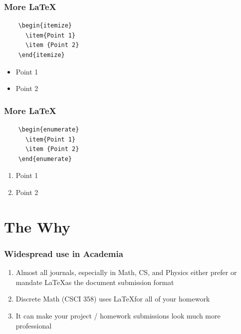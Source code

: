 \documentclass{beamer}
\begin{document}
\begin{frame}[fragile]
  \frametitle{More \LaTeX}
  \begin{verbatim}
    \begin{itemize}
      \item{Point 1}
      \item {Point 2}
    \end{itemize}
  \end{verbatim}\par
    \hrulefill\par
  
  
    \begin{itemize}
      \item{Point 1}
      \item {Point 2}
    \end{itemize}
  
  \end{frame}

\begin{frame}[fragile]
  \frametitle{More \LaTeX}
  \begin{verbatim}
    \begin{enumerate}
      \item{Point 1}
      \item {Point 2}
    \end{enumerate}
  \end{verbatim}\par
    \hrulefill\par
  
  
    \begin{enumerate}
      \item{Point 1}
      \item {Point 2}
    \end{enumerate}
  
  \end{frame}

\section{The Why}


\begin{frame}[fragile]
  \frametitle{Widespread use in Academia}

  \begin{enumerate}
    \item {Almost all journals, especially in Math, CS, and Physics
      either prefer or mandate \LaTeX as the document submission
      format}
    \item {Discrete Math (CSCI 358) uses \LaTeX for all of your homework}
    \item {It can make your project / homework submissions look much more professional}
   \end{enumerate}

\vskip 1cm

\end{frame}
\end{document}
